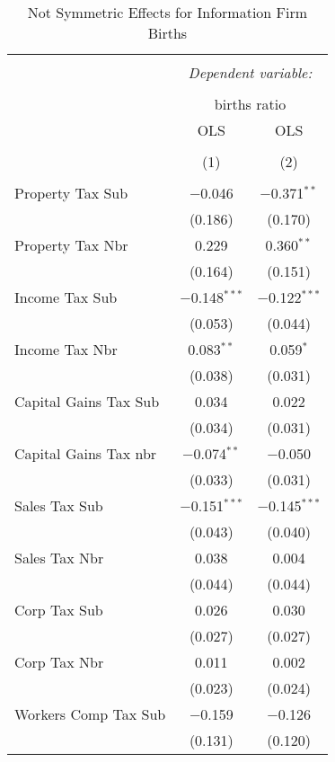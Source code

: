 
\begin{table}[!htbp] \centering 
  \caption{Not Symmetric Effects for  Information Firm Births} 
  \label{51noequality} 
\begin{tabular}{@{\extracolsep{5pt}}lcc} 
\\[-1.8ex]\hline 
\hline \\[-1.8ex] 
 & \multicolumn{2}{c}{\textit{Dependent variable:}} \\ 
\cline{2-3} 
\\[-1.8ex] & \multicolumn{2}{c}{births ratio} \\ 
 & OLS & OLS \\ 
\\[-1.8ex] & (1) & (2)\\ 
\hline \\[-1.8ex] 
 Property Tax Sub & $-$0.046 & $-$0.371$^{**}$ \\ 
  & (0.186) & (0.170) \\ 
  Property Tax Nbr & 0.229 & 0.360$^{**}$ \\ 
  & (0.164) & (0.151) \\ 
  Income Tax Sub & $-$0.148$^{***}$ & $-$0.122$^{***}$ \\ 
  & (0.053) & (0.044) \\ 
  Income Tax Nbr & 0.083$^{**}$ & 0.059$^{*}$ \\ 
  & (0.038) & (0.031) \\ 
  Capital Gains Tax Sub & 0.034 & 0.022 \\ 
  & (0.034) & (0.031) \\ 
  Capital Gains Tax nbr & $-$0.074$^{**}$ & $-$0.050 \\ 
  & (0.033) & (0.031) \\ 
  Sales Tax Sub & $-$0.151$^{***}$ & $-$0.145$^{***}$ \\ 
  & (0.043) & (0.040) \\ 
  Sales Tax Nbr & 0.038 & 0.004 \\ 
  & (0.044) & (0.044) \\ 
  Corp Tax Sub & 0.026 & 0.030 \\ 
  & (0.027) & (0.027) \\ 
  Corp Tax Nbr & 0.011 & 0.002 \\ 
  & (0.023) & (0.024) \\ 
  Workers Comp Tax Sub & $-$0.159 & $-$0.126 \\ 
  & (0.131) & (0.120) \\ 

\end{tabular}
\end{table}
